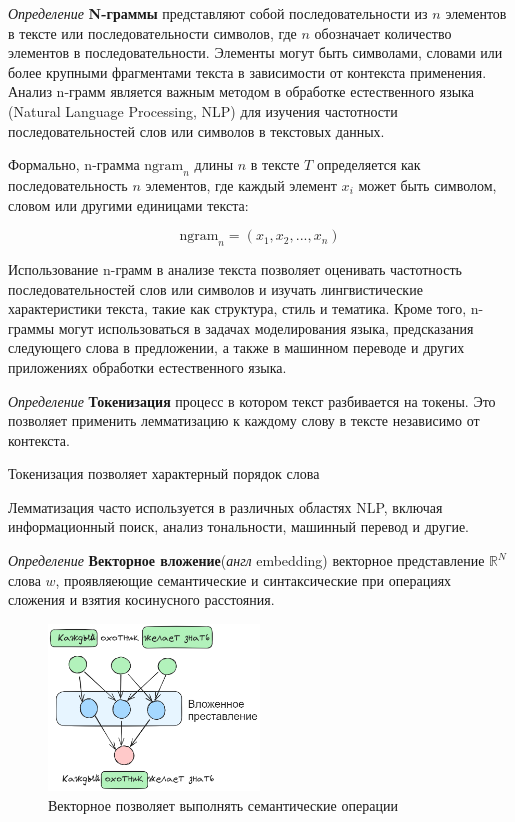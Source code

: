 \textit{Определение} \textbf{N-граммы} представляют собой последовательности из \( n \) элементов в тексте или последовательности символов, где \( n \) обозначает количество элементов в последовательности. Элементы могут быть символами, словами или более крупными фрагментами текста в зависимости от контекста применения. Анализ n-грамм является важным методом в обработке естественного языка (Natural Language Processing, NLP) для изучения частотности последовательностей слов или символов в текстовых данных.

Формально, n-грамма \( \text{ngram}_n \) длины \( n \) в тексте \( T \) определяется как последовательность \( n \) элементов, где каждый элемент \( x_i \) может быть символом, словом или другими единицами текста:

\[ \text{ngram}_n = (x_1, x_2, ..., x_n) \]

Использование n-грамм в анализе текста позволяет оценивать частотность последовательностей слов или символов и изучать лингвистические характеристики текста, такие как структура, стиль и тематика. Кроме того, n-граммы могут использоваться в задачах моделирования языка, предсказания следующего слова в предложении, а также в машинном переводе и других приложениях обработки естественного языка.

\textit{Определение} \textbf{Токенизация} процесс в котором текст разбивается на токены. 
Это позволяет применить лемматизацию к каждому слову в тексте независимо от контекста.

Токенизация позволяет характерный порядок слова

 Лемматизация часто используется в различных областях NLP, включая информационный поиск, анализ тональности, машинный перевод и другие.

\textit{Определение } \textbf{Векторное вложение}(\textit{англ} embedding) векторное представление $\mathbb{R}^N$ слова $w$,
проявляеющие семантические и синтаксические при операциях сложения и взятия косинусного расстояния.

\begin{figure}[h]
    \centering
    \includegraphics[width=0.5\textwidth]{assets/ml/nlp/word2vec.excalidraw.png}
    \caption{Векторное позволяет выполнять семантические операции}
    \label{word2vec}
\end{figure}

